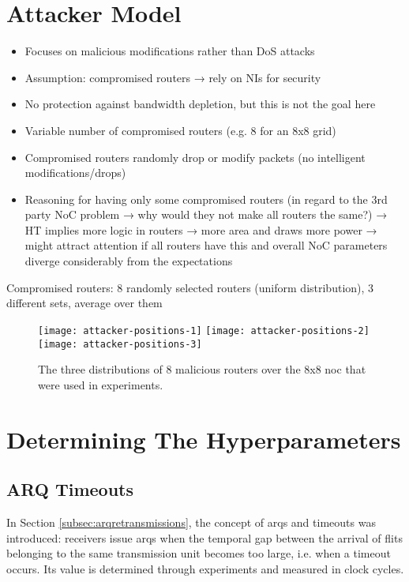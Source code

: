 \section{Attacker Model}\label{sec:attackermodeleval}
\begin{itemize}
    \item Focuses on malicious modifications rather than DoS attacks
    \item Assumption: compromised routers → rely on NIs for security
    \item No protection against bandwidth depletion, but this is not the goal here
    \item Variable number of compromised routers (e.g. 8 for an 8x8 grid)
    \item Compromised routers randomly drop or modify packets (no intelligent modifications/drops)
    \item Reasoning for having only some compromised routers (in regard to the 3rd party NoC problem → why would they not make all routers the same?)
        → HT implies more logic in routers → more area and draws more power → might attract attention if all routers have this and overall NoC
        parameters diverge considerably from the expectations
\end{itemize}

Compromised routers: 8 randomly selected routers (uniform distribution), 3 different sets, average over them

\begin{figure}
    \texttt{[image: attacker-positions-1]}\hfill
    \texttt{[image: attacker-positions-2]}\hfill
    \texttt{[image: attacker-positions-3]}
    \caption[Malicious router distributions]{The three distributions of 8 malicious routers over the 8x8 \gls{noc} that were used in experiments.}
    \label{fig:attackerpositions}
\end{figure}

\section{Determining The Hyperparameters}\label{sec:hyperparamseval}
\subsection{ARQ Timeouts}\label{subsec:arqtimeouts}
In Section \ref{subsec:arqretransmissions}, the concept of \glspl{arq} and timeouts was introduced: receivers issue \glspl{arq} when the temporal gap
between the arrival of flits belonging to the same transmission unit becomes too large, i.e. when a timeout occurs. Its value is determined through
experiments and measured in clock cycles.

